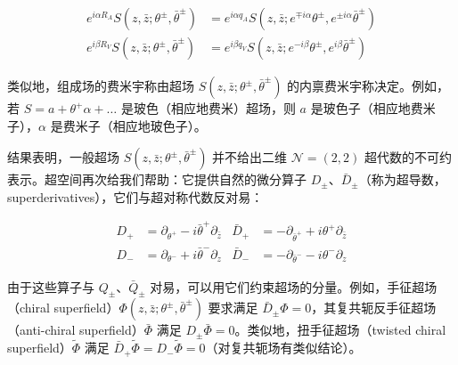 \begin{equation}
\begin{aligned}
e^{i\alpha R_A}S(z,\bar z;\theta^\pm,\bar\theta^\pm) &= e^{i\alpha q_A}S(z,\bar z;e^{\mp i\alpha}\theta^\pm,e^{\pm i\alpha}\bar\theta^\pm)\\
e^{i\beta R_V}S(z,\bar z;\theta^\pm,\bar\theta^\pm) &= e^{i\beta q_V}S(z,\bar z;e^{-i\beta}\theta^\pm,e^{i\beta}\bar\theta^\pm)
\end{aligned}\tag{2.13}
\end{equation}

类似地，组成场的费米宇称由超场 $S(z,\bar z;\theta^\pm,\bar\theta^\pm)$ 的内禀费米宇称决定。例如，若 $S=a+\theta^+\alpha+\ldots$ 是玻色（相应地费米）超场，则 $a$ 是玻色子（相应地费米子），$\alpha$ 是费米子（相应地玻色子）。

结果表明，一般超场 $S(z,\bar z;\theta^\pm,\bar\theta^\pm)$ 并不给出二维 $\mathcal{N}=(2,2)$ 超代数的不可约表示。超空间再次给我们帮助：它提供自然的微分算子 $D_\pm$、$\bar D_\pm$（称为超导数，superderivatives），它们与超对称代数反对易：

\begin{equation}
\begin{aligned}
D_+ &= \partial_{\theta^+} - i\bar\theta^+\partial_{\bar z} & \bar D_+ &= -\partial_{\bar\theta^+} + i\theta^+\partial_{\bar z}\\
D_- &= \partial_{\theta^-} + i\bar\theta^-\partial_z & \bar D_- &= -\partial_{\bar\theta^-} - i\theta^-\partial_z
\end{aligned}\tag{2.14}
\end{equation}

由于这些算子与 $Q_\pm$、$\bar Q_\pm$ 对易，可以用它们约束超场的分量。例如，手征超场（chiral superfield）$\Phi(z,\bar z;\theta^\pm,\bar\theta^\pm)$ 要求满足 $\bar D_\pm\Phi=0$，其复共轭反手征超场（anti-chiral superfield）$\bar\Phi$ 满足 $D_\pm\bar\Phi=0$。类似地，扭手征超场（twisted chiral superfield）$\tilde\Phi$ 满足 $\bar D_+\tilde\Phi=D_-\tilde\Phi=0$（对复共轭场有类似结论）。


